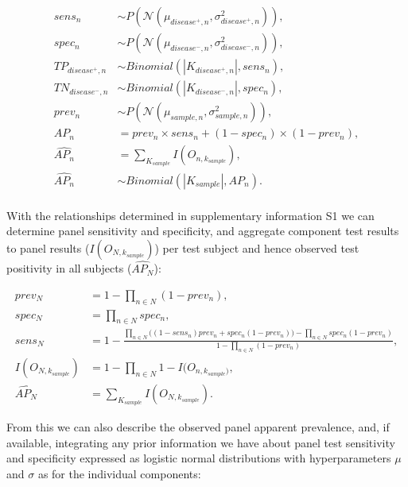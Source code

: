 \documentclass[a4paper, 12pt, twoside]{article}
\begin{document}
\begin{equation*}
\begin{aligned}
sens_n &\sim P(\mathcal{N}(\mu_{disease^+,n}, \sigma_{disease^+,n}^2)), \\
spec_n &\sim P(\mathcal{N}(\mu_{disease^-,n}, \sigma_{disease^-,n}^2)), \\
TP_{disease^+,n} &\sim Binomial(|K_{disease^+,n}|, sens_n), \\
TN_{disease^-,n} &\sim Binomial(|K_{disease^-,n}|, spec_n), \\
prev_n &\sim P(\mathcal{N}(\mu_{sample,n}, \sigma_{sample,n}^2)), \\
AP_n &= prev_n \times sens_n + (1-spec_n) \times (1-prev_n), \\
\widehat{AP_n} &= \sum_{K_{sample}}{I(O_{n,k_{sample}})}, \\
\widehat{AP_n} &\sim Binomial(|K_{sample}|, AP_n). \\
\end{aligned}
\end{equation*}

With the relationships determined in supplementary information S1 we can determine panel sensitivity and specificity, and aggregate component test results to panel results (\(I(O_{N,k_{sample}})\)) per test subject and hence observed test positivity in all subjects (\(\widehat{AP_N}\)):

\begin{equation*}
\begin{aligned}
prev_N &= 1-\prod_{n \in N}(1-prev_n), \\
spec_N &= \prod_{n \in N}{spec_n}, \\
sens_N &= 1-\frac{
  \prod_{n \in N}{\bigg((1-sens_n) prev_n + spec_n  (1-prev_n) \bigg) } - \prod_{n \in N}{spec_n (1-prev_n)}
}{
  1 - \prod_{n \in N}{ (1-prev_n)} %
}, \\
I(O_{N,k_{sample}}) &= 1-\prod_{n \in N}{1-I(O_{n,k_{sample})}}, \\
\widehat{AP_N} &= \sum_{K_{sample}}{I(O_{N,k_{sample}})}.
\end{aligned}
\end{equation*}

From this we can also describe the observed panel apparent prevalence, and, if available, integrating any prior information we have about panel test sensitivity and specificity expressed as logistic normal distributions with hyperparameters \(\mu\) and \(\sigma\) as for the individual components:
\end{document}
